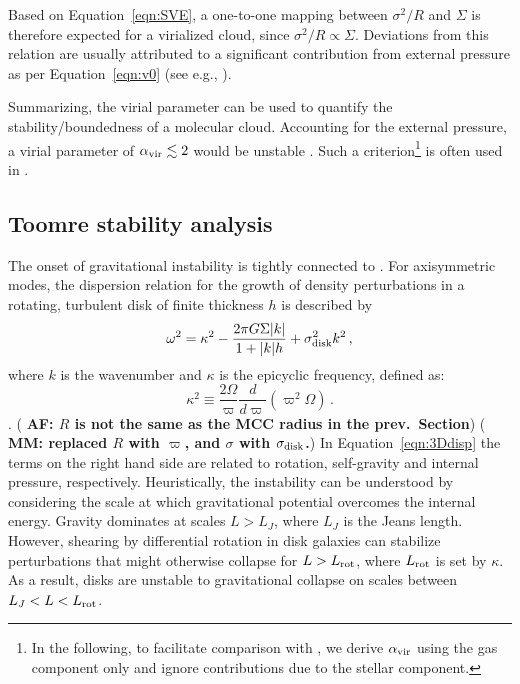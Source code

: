 \IfFileExists{emulateapjlegacy.cls}{\documentclass[iop]{emulateapjlegacy}}{\documentclass[iop]{emulateapj}}
\def\altomega{\varpi}
\newcommand{\AF}[1]{({\bf \color{afcolor} AF: #1})}
\newcommand{\MM}[1]{({\bf \color{mmcolor} MM: #1})}
\begin{document}
Based on Equation~\ref{eqn:SVE}, a one-to-one mapping between $\sigma^2/R$ and $\Sigma$ is therefore expected for a virialized cloud, since $\sigma^2/R\propto\Sigma$. Deviations from this relation are usually attributed to a significant contribution from external pressure as per Equation~\ref{eqn:v0} (see e.g., \citealt{Heyer09a, Hughes10a, Hughes13b, Meidt13a}).

Summarizing, the virial parameter can be used to quantify the stability/boundedness of 
    a molecular cloud.
Accounting for the external pressure, a virial parameter of $\alpha_{\rm vir}\lesssim2$ would be unstable \citep{bertoldi:1992}.
%
Such a criterion\footnote{In the following, to facilitate comparison with \obs, we derive $\alpha_{\rm vir}$ using the gas component only and ignore contributions due to the stellar component.} is often used in \obs \citep[see e.g., ][]{Kauffmann17b}. 

\subsection{Toomre stability analysis}\label{sec:Q}

The onset of gravitational instability is 
tightly connected to \SF \citep[e.g.,][]{Kennicutt89a, Wang94a, Li05b, Li06a}. 
For axisymmetric modes, the dispersion relation for the growth of density perturbations in a rotating, turbulent disk of finite thickness $h$ is described by
\begin{equation}
\omega^2 = \kappa^2 - \frac{2\pi G \Sigma |k|}{1 + |k| h} + \sigma_{\rm disk}^2 k^2\,,
\label{eqn:3Ddisp}
\end{equation}
where $k$ is the wavenumber and $\kappa$ is the epicyclic frequency, defined as:
\begin{equation}
\kappa^2\equiv\frac{2\Omega}{\altomega}\frac{d}{d\altomega}\left(\altomega^2\Omega\right)\,.
\label{eqn:kappa}
\end{equation}
\citep{Romeo92a}.
\AF{$R$ is not the same as the MCC radius in the prev.\ Section} \MM{replaced $R$ with $\altomega$, and $\sigma$ with $\sigma_{\rm disk}$.}
In Equation~\ref{eqn:3Ddisp} the terms on the right hand side are related to rotation, self-gravity and internal pressure, respectively. 
    Heuristically, the instability can be understood by considering the scale
 at which gravitational potential overcomes the internal energy. Gravity dominates at scales $L > L_J$, where $L_J$ is the Jeans length. However, 
   shearing by 
differential rotation in disk galaxies can stabilize perturbations 
    that might otherwise collapse for $L > L_{\rm rot}$, where $L_{\rm rot}$ is set by $\kappa$.
    As a result, disks are unstable to gravitational collapse on 
scales between $L_J < L < L_{\rm rot}$.  
\end{document}
